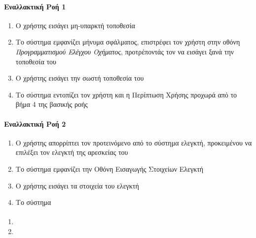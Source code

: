 \documentclass{../ol-softwaremanual}
\begin{document}
	
	
	\paragraph{Εναλλακτική Ροή 1}
	
	\begin{enumerate}
		\item Ο χρήστης εισάγει μη-υπαρκτή τοποθεσία
		\item Το σύστημα εμφανίζει μήνυμα σφάλματος, επιστρέφει τον χρήστη στην οθόνη \textit{Προγραμματισμού Ελέγχου Οχήματος}, προτρέποντάς τον να εισάγει ξανά την τοποθεσία του
		\item Ο χρήστης εισάγει την σωστή τοποθεσία του
		\item Το σύστημα εντοπίζει τον χρήστη και η Περίπτωση Χρήσης προχωρά από το βήμα 4 της βασικής ροής
	\end{enumerate}
	
	\paragraph{Εναλλακτική Ροή 2}
	
	\begin{enumerate}
		\item Ο χρήστης απορρίπτει τον προτεινόμενο από το σύστημα ελεγκτή, προκειμένου να επιλέξει τον ελεγκτή της αρεσκείας του
		\item Το σύστημα εμφανίζει την Οθόνη Εισαγωγής Στοιχείων Ελεγκτή
		\item Ο χρήστης εισάγει τα στοιχεία του ελεγκτή
		\item Το σύστημα 
	\end{enumerate}	

	\paragraph{}
	
	\begin{enumerate}
		\item {}
		\item {}
	\end{enumerate}
	
\end{document}
